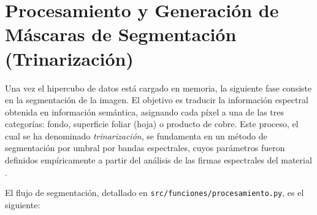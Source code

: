 \section{Procesamiento y Generación de Máscaras de Segmentación (Trinarización)}

Una vez el  hipercubo de datos está cargado en memoria, la siguiente fase consiste en la segmentación de la imagen. El objetivo es traducir la información espectral obtenida en información semántica, asignando cada píxel a una de las tres categorías: fondo, superficie foliar (hoja) o producto de cobre. Este proceso, el cual se ha denominado \textit{trinarización}, se fundamenta en un método de segmentación por umbral  por bandas espectrales, cuyos parámetros fueron definidos empíricamente a partir del análisis de las firmas espectrales del material \cite{SANCHEZ2025101049}.

El flujo de segmentación, detallado en \verb|src/funciones/procesamiento.py|, es el siguiente:

